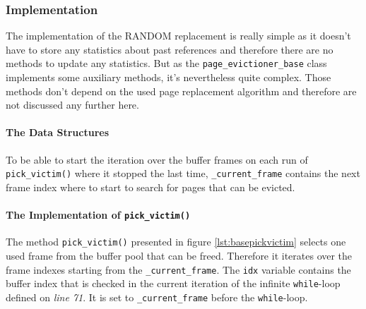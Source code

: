 \subsubsection{Implementation}

    The implementation of the RANDOM replacement is really simple as it doesn't have to store any statistics about past references and therefore there are no methods to update any statistics. But as the \lstinline{page_evictioner_base} class implements some auxiliary methods, it's nevertheless quite complex. Those methods don't depend on the used page replacement algorithm and therefore are not discussed any further here.

\paragraph{The Data Structures}

\begin{@empty}
    \lstset{
        language = [ISO]C++,
        style = basic
    }
    \begin{code}[ht!]
        \caption{Data Structures of the Class \lstinline{page_evictioner_base}} \label{lst:basedef}
        
    \end{code}
\end{@empty}

    To be able to start the iteration over the buffer frames on each run of \lstinline{pick_victim()} where it stopped the last time, \lstinline{_current_frame} contains the next frame index where to start to search for pages that can be evicted.

\paragraph{The Implementation of \lstinline{pick_victim()}}

\begin{@empty}
    \lstset{
        language = [ISO]C++,
        style = basic
    }
    \begin{code}[ht!]
        \caption{Implementation of \lstinline{page_evictioner_base::pick_victim()}} \label{lst:basepickvictim}
        
    \end{code}
\end{@empty}

    The method \lstinline{pick_victim()} presented in figure \ref{lst:basepickvictim} selects one used frame from the buffer pool that can be freed. Therefore it iterates over the frame indexes starting from the \lstinline{_current_frame}. The \lstinline{idx} variable contains the buffer index that is checked in the current iteration of the infinite \lstinline{while}-loop defined on \emph{line 71}. It is set to \lstinline{_current_frame} before the \lstinline{while}-loop.

